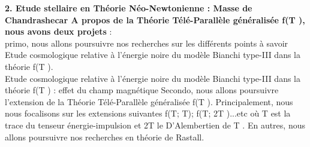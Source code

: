 \documentclass[a4paper,12pt]{report}
\theoremstyle{plain}
\theoremstyle{plain}
\begin{document}
\textbf{2. Etude stellaire en Théorie Néo-Newtonienne : Masse de Chandrashecar
	A propos de la Théorie Télé-Parallèle généralisée f(T ), nous avons deux projets} : \\
primo, nous allons poursuivre nos recherches sur les différents points à savoir
	Etude cosmologique relative à l’énergie noire du modèle Bianchi type-III dans la
	théorie f(T ). \\

 Etude cosmologique relative à l’énergie noire du modèle Bianchi type-III dans la
	théorie f(T ) : effet du champ magnétique
	Secondo, nous allons poursuivre l’extension de la Théorie Télé-Parallèle généralisée f(T ).
	Principalement, nous nous focalisons sur les extensions suivantes f(T; T); f(T; 2T )...etc
	où T est la trace du tenseur énergie-impulsion et 2T le D’Alembertien de T .
	En autres, nous allons poursuivre nos recherches en théorie de Rastall.


\end{document}
